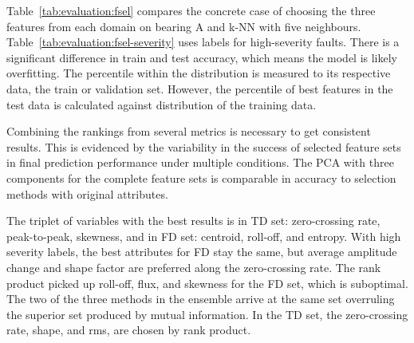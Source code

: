 Table~\ref{tab:evaluation:fsel} compares the concrete case of choosing the three features from each domain on bearing A and k-NN with five neighbours. Table~\ref{tab:evaluation:fsel-severity} uses labels for high-severity faults. There is a significant difference in train and test accuracy, which means the model is likely overfitting. The percentile within the distribution is measured to its respective data, the train or validation set. However, the percentile of best features in the test data is calculated against distribution of the training data.

Combining the rankings from several metrics is necessary to get consistent results. This is evidenced by the variability in the success of selected feature sets in final prediction performance under multiple conditions. The PCA with three components for the complete feature sets is comparable in accuracy to selection methods with original attributes.

The triplet of variables with the best results is in TD set: zero-crossing rate, peak-to-peak, skewness, and in FD set: centroid, roll-off, and entropy. With high severity labels, the best attributes for FD stay the same, but average amplitude change and shape factor are preferred along the zero-crossing rate. The rank product picked up roll-off, flux, and skewness for the FD set, which is suboptimal. The two of the three methods in the ensemble arrive at the same set overruling the superior set produced by mutual information. In the TD set, the zero-crossing rate, shape, and rms, are chosen by rank product. 

